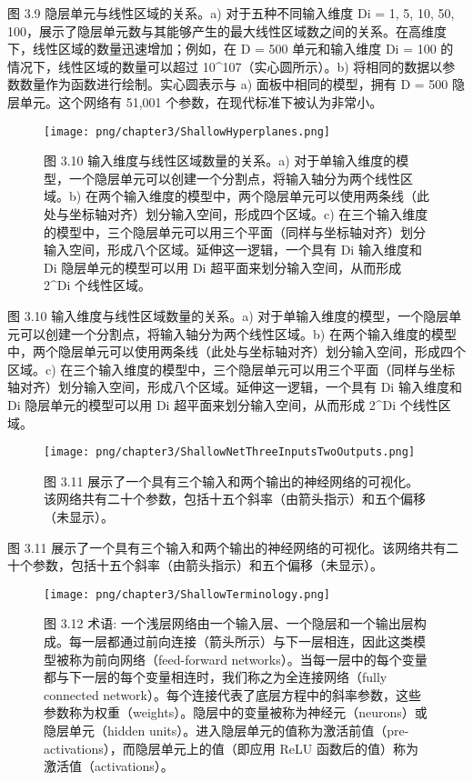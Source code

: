 图 3.9 隐层单元与线性区域的关系。a) 对于五种不同输入维度 Di = {1, 5, 10, 50, 100}，展示了隐层单元数与其能够产生的最大线性区域数之间的关系。在高维度下，线性区域的数量迅速增加；例如，在 D = 500 单元和输入维度 Di = 100 的情况下，线性区域的数量可以超过 10^107（实心圆所示）。b) 将相同的数据以参数数量作为函数进行绘制。实心圆表示与 a) 面板中相同的模型，拥有 D = 500 隐层单元。这个网络有 51,001 个参数，在现代标准下被认为非常小。


\begin{figure}[h!]
\centering
\texttt{[image: png/chapter3/ShallowHyperplanes.png]}
\caption{图 3.10 输入维度与线性区域数量的关系。a) 对于单输入维度的模型，一个隐层单元可以创建一个分割点，将输入轴分为两个线性区域。b) 在两个输入维度的模型中，两个隐层单元可以使用两条线（此处与坐标轴对齐）划分输入空间，形成四个区域。c) 在三个输入维度的模型中，三个隐层单元可以用三个平面（同样与坐标轴对齐）划分输入空间，形成八个区域。延伸这一逻辑，一个具有 Di 输入维度和 Di 隐层单元的模型可以用 Di 超平面来划分输入空间，从而形成 2^Di 个线性区域。}
\end{figure}


图 3.10 输入维度与线性区域数量的关系。a) 对于单输入维度的模型，一个隐层单元可以创建一个分割点，将输入轴分为两个线性区域。b) 在两个输入维度的模型中，两个隐层单元可以使用两条线（此处与坐标轴对齐）划分输入空间，形成四个区域。c) 在三个输入维度的模型中，三个隐层单元可以用三个平面（同样与坐标轴对齐）划分输入空间，形成八个区域。延伸这一逻辑，一个具有 Di 输入维度和 Di 隐层单元的模型可以用 Di 超平面来划分输入空间，从而形成 2^Di 个线性区域。

\begin{figure}[h!]
\centering
\texttt{[image: png/chapter3/ShallowNetThreeInputsTwoOutputs.png]}
\caption{图 3.11 展示了一个具有三个输入和两个输出的神经网络的可视化。该网络共有二十个参数，包括十五个斜率（由箭头指示）和五个偏移（未显示）。}
\end{figure}

图 3.11 展示了一个具有三个输入和两个输出的神经网络的可视化。该网络共有二十个参数，包括十五个斜率（由箭头指示）和五个偏移（未显示）。

\begin{figure}[h!]
\centering
\texttt{[image: png/chapter3/ShallowTerminology.png]}
\caption{图 3.12 术语: 一个浅层网络由一个输入层、一个隐层和一个输出层构成。每一层都通过前向连接（箭头所示）与下一层相连，因此这类模型被称为前向网络（feed-forward networks）。当每一层中的每个变量都与下一层的每个变量相连时，我们称之为全连接网络（fully connected network）。每个连接代表了底层方程中的斜率参数，这些参数称为权重（weights）。隐层中的变量被称为神经元（neurons）或隐层单元（hidden units）。进入隐层单元的值称为激活前值（pre-activations），而隐层单元上的值（即应用 ReLU 函数后的值）称为激活值（activations）。}
\end{figure}


